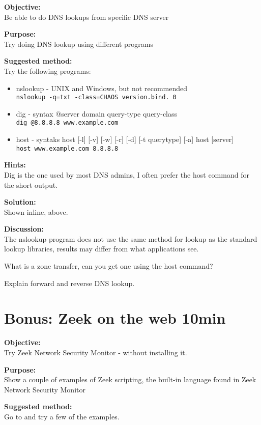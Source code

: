 \documentclass[a4paper,11pt,notitlepage]{report}
\begin{document}
{\bf Objective:}\\
Be able to do DNS lookups from specific DNS server

{\bf Purpose:}\\
Try doing DNS lookup using different programs

{\bf Suggested method:}\\
Try the following programs:
\begin{itemize}
\item nslookup - UNIX and Windows, but not recommended\\
\verb+nslookup -q=txt -class=CHAOS version.bind. 0+
\item dig - syntax @server domain query-type query-class\\
\verb+dig @8.8.8.8 www.example.com+
\item host - syntaks host [-l] [-v] [-w] [-r] [-d] [-t querytype] [-a] host [server]\\
\verb+host www.example.com 8.8.8.8+
\end{itemize}

{\bf Hints:}\\
Dig is the one used by most DNS admins, I often prefer the host command for the short output.

{\bf Solution:}\\
Shown inline, above.

{\bf Discussion:}\\
The nslookup program does not use the same method for lookup as the standard lookup libraries, results may differ from what applications see.

What is a zone transfer, can you get one using the host command?

Explain forward and reverse DNS lookup.



\chapter{Bonus: Zeek on the web 10min}
\label{ex:zeekweb}


{\bf Objective:} \\
Try Zeek Network Security Monitor - without installing it.


{\bf Purpose:}\\
Show a couple of examples of Zeek scripting, the built-in language found in Zeek Network Security Monitor


{\bf Suggested method:}\\
Go to  and try a few of the examples.
\end{document}
